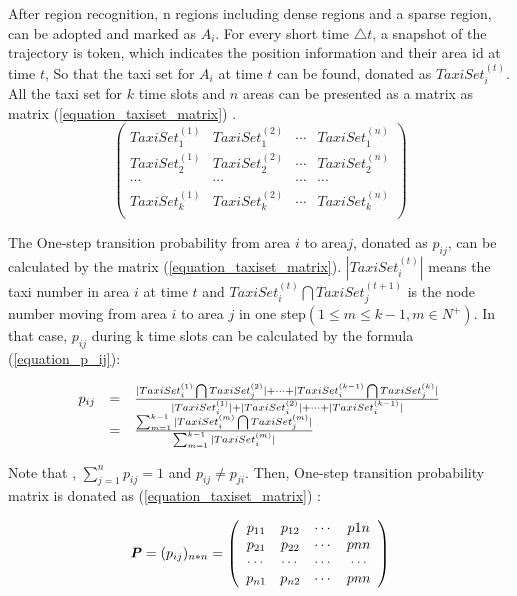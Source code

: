         After region recognition, n regions including dense regions and a sparse region, can be adopted and marked as $A_i$.  For every short time $\triangle t$, a snapshot of the trajectory is token, which indicates the position information and their area id at time $t$, So that the taxi set for $A_i$ at time $t$ can be found, donated as $TaxiSet^{(t)}_i$. All the taxi set for $k$ time slots and $n$ areas can be presented as a matrix as matrix (\ref{equation_taxiset_matrix}) .
\begin{equation}\label{equation_taxiset_matrix}
\left(
\begin{array}{cccc}
TaxiSet^{(1)}_1 &  TaxiSet^{(2)}_1 & \cdots & TaxiSet^{(n)}_1\\
TaxiSet^{(1)}_2 &  TaxiSet^{(2)}_2 & \cdots & TaxiSet^{(n)}_2 \\
\cdots & \cdots & \cdots & \cdots \\
TaxiSet^{(1)}_k &  TaxiSet^{(2)}_k &  \cdots  & TaxiSet^{(n)}_k \\
\end{array}
\right)
\end{equation}

The One-step transition probability from area $i$ to area$j$, donated as $p_{ij}$, can be calculated by the matrix (\ref{equation_taxiset_matrix}). $|TaxiSet^{(t)}_i|$ means the taxi number in area $i$ at time $t$ and $TaxiSet^{(t)}_i\bigcap TaxiSet^{(t+1)}_j$ is the node number moving from area $i$ to area $j$ in one step$(1\leq m \leq k-1, m\in N^{+} )$.  In that case, $p_{ij}$  during k time slots can be calculated by the formula (\ref{equation_p_ij}):


\begin{equation}\label{equation_p_ij}
\begin{array}{rcl}
  p_{ij}& =&{ {|TaxiSet^{(1)}_i\bigcap TaxiSet^{(2)}_j|+\cdots + |TaxiSet^{(k-1)}_i\bigcap TaxiSet^{(k)}_j|}\over {|TaxiSet^{(1)}_i|+|TaxiSet^{(2)}_i|+\cdots+|TaxiSet^{(k-1)}_i|}} \\
  &=& {\sum_{m=1}^{k-1} |TaxiSet^{(m)}_i\bigcap TaxiSet^{(m)}_j|\over \sum_{m=1}^{k-1}|TaxiSet^{(m)}_i|}\\
  \end{array}
\end{equation}

Note that , $\sum_{j=1}^np_{ij}=1 $ and $p_{ij}\neq p_{ji}$. Then, One-step transition probability matrix is donated as (\ref{equation_taxiset_matrix}) :

\begin{equation}\label{equation_taxiset_matrix}
\textbf{\emph{P}}=(p_{ij})_{n*n}=
\left(
\begin{array}{cccc}
p_{11}&p_{12}&\cdots & p{1n} \\
p_{21}&p_{22}&\cdots & p{nn} \\
\cdots & \cdots & \cdots & \cdots \\
p_{n1}&p_{n2}&\cdots & p{nn} \\
\end{array}
\right)
\end{equation}

